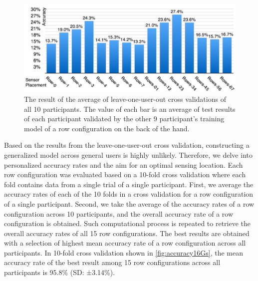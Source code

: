 \documentclass{sigchi}
\begin{document}
\begin{figure}
 \begin{center}
  \includegraphics[width=1\columnwidth]{figures/LOO_V2.pdf}
  \caption{
    The result of the average of leave-one-user-out cross validations of all 10 participants.
    The value of each bar is an average of test results of each participant validated by the other 9 participant's training model of a row configuration on the back of the hand.
  }
  \label{fig:LOO}
  \end{center}
\end{figure}

Based on the results from the leave-one-user-out cross validation, constructing a generalized model across general users is highly unlikely. Therefore, we delve into personalized accuracy rates and the aim for an optimal sensing location.
Each row configuration was evaluated based on a 10-fold cross validation where each fold contains data from a single trial of a single participant.
First, we average the accuracy rates of each of the 10 folds in a cross validation for a row configuration of a single participant.
Second, we take the average of the accuracy rates of a row configuration across 10 participants, and the overall accuracy rate of a row configuration is obtained.
Such computational process is repeated to retrieve the overall accuracy rates of all 15 row configurations.
The best results are obtained with a selection of highest mean accuracy rate of a row configuration across all participants.
In 10-fold cross validation shown in \autoref{fig:accuracy16Gs}, the mean accuracy rate of the best result among 15 row configurations across all participants is 95.8\% (SD: ±3.14\%).
\end{document}
